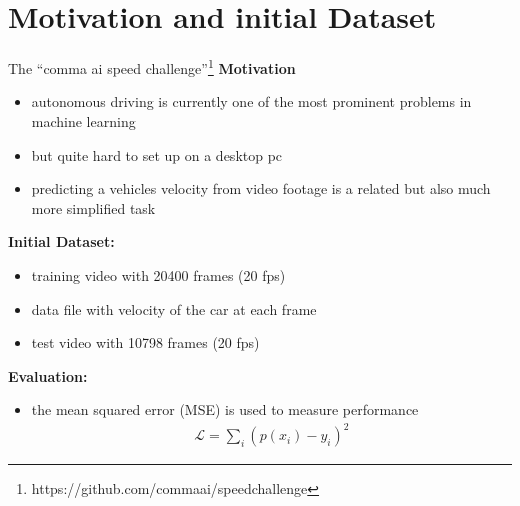 \section{Motivation and initial Dataset}


\begin{frame}{The \enquote{comma ai speed challenge}\footnote{https://github.com/commaai/speedchallenge}}
	\textbf{Motivation}
	\begin{itemize}
		\item autonomous driving is currently one of the most prominent problems in machine learning
		\item but quite hard to set up on a desktop pc
		\item predicting a vehicles velocity from video footage is a related but also much more simplified task
	\end{itemize}
	\pause
	\textbf{Initial Dataset:}
	\begin{itemize}
		\item training video with 20400 frames (20 fps)
		\item data file with velocity of the car at each frame
		\item test video with 10798 frames (20 fps)
	\end{itemize}
	\pause
	\textbf{Evaluation:}
	\begin{itemize}
		\item the mean squared error (MSE) is used to measure performance
		\begin{align*}
			\mathcal{L} = \sum_i (p(x_i) - y_i)^2
		\end{align*}
	\end{itemize}
\end{frame}

